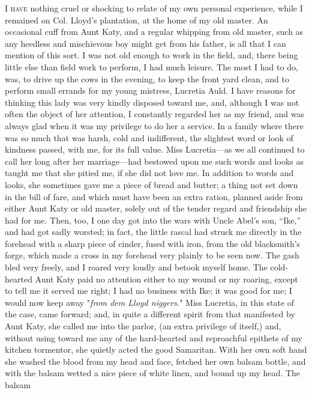 \textsc{I have} nothing cruel or shocking to relate of my own personal
experience, while I remained on Col. Lloyd's plantation, at the home of
my old master. An occasional cuff from Aunt Katy, and a regular whipping
from old master, such as any heedless and mischievous boy might get from
his father, is all that I can mention of this sort. I was not old enough
to work in the field, and, there being little else than field work to
perform, I had much leisure. The most I had to do, was, to drive up the
cows in the evening, to keep the front yard clean, and to perform small
errands for my young mistress, Lucretia Auld. I have reasons for
thinking this lady was very kindly disposed toward me, and, although I
was not often the object of her attention, I constantly regarded her as
my friend, and was always glad when it was my privilege to do her a
service. In a family where there {\protect\hypertarget{130}{}{}}was so
much that was harsh, cold and indifferent, the slightest word or look of
kindness passed, with me, for its full value. Miss Lucretia---as we all
continued to call her long after her marriage---had bestowed upon me
such words and looks as taught me that she pitied me, if she did not
love me. In addition to words and looks, she sometimes gave me a piece
of bread and butter; a thing not set down in the bill of fare, and which
must have been an extra ration, planned aside from either Aunt Katy or
old master, solely out of the tender regard and friendship she had for
me. Then, too, I one day got into the wars with Uncle Abel's son,
``Ike,'' and had got sadly worsted; in fact, the little rascal had
struck me directly in the forehead with a sharp piece of cinder, fused
with iron, from the old blacksmith's forge, which made a cross in my
forehead very plainly to be seen now. The gash bled very freely, and I
roared very loudly and betook myself home. The cold-hearted Aunt Katy
paid no attention either to my wound or my roaring, except to tell me it
served me right; I had no business with Ike; it was good for me; I would
now keep away "\emph{from dem Lloyd niggers.}" Miss Lucretia, in this
state of the case, came forward; and, in quite a different spirit from
that manifested by Aunt Katy, she called me into the parlor, (an extra
privilege of itself,) and, without using toward me any of the
hard-hearted and reproachful epithets of my kitchen tormentor, she
quietly acted the good Samaritan. With her own soft hand she washed the
blood from my head and face, fetched her own balsam bottle, and with the
balsam wetted a nice piece of white
{\protect\hypertarget{131}{}{}}linen, and bound up my head. The balsam
